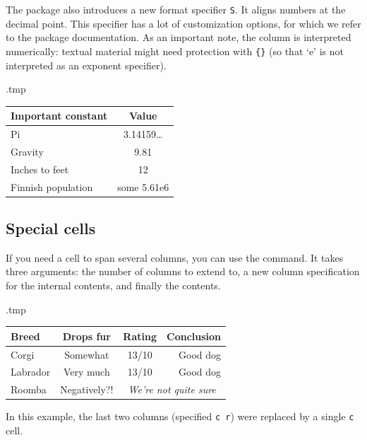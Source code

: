 The  package also introduces a new format specifier \verb|S|.
It aligns numbers at the decimal point.
This specifier has a lot of customization options, for which we refer to the package documentation.
As an important note, the column is interpreted numerically:
textual material might need protection with \verb|{}|
(so that `e' is not interpreted as an exponent specifier).\label{ex:table siunitx}
%
\begin{VerbatimOut}{\jobname.tmp}
\centering
\begin{tabular}{l| S}
Important constant & {Value}\\
\hline
Pi & 3.14159\ldots\\
Gravity & 9.81\\
Inches to feet & 12\\
Finnish population & {some } 5.61e6
\end{tabular}
\end{VerbatimOut}
\ShowExampleBelow[2]



%
%
\subsection{Special cells}

If you need a cell to span several columns,
you can use the  command.
It takes three arguments: the number of columns to extend to,
a new column specification for the internal contents, and finally the contents.\label{ex:extrarowheight}
%
\begin{VerbatimOut}{\jobname.tmp}
\setlength\extrarowheight{2pt}
\centering
\begin{tabular}{l| c c @{ $\Rightarrow$ } r}
Breed & Drops fur & Rating & Conclusion\\
\hline
Corgi & Somewhat & 13/10 & Good dog\\
Labrador & Very much & 13/10 & Good dog\\
Roomba & Negatively?! &
    \multicolumn{2}{c}{\emph{We're not quite sure}}
\end{tabular}
\end{VerbatimOut}
\ShowExampleBelow
%
In this example, the last two columns (specified \verb|c r|)
were replaced by a single \verb|c| cell.

